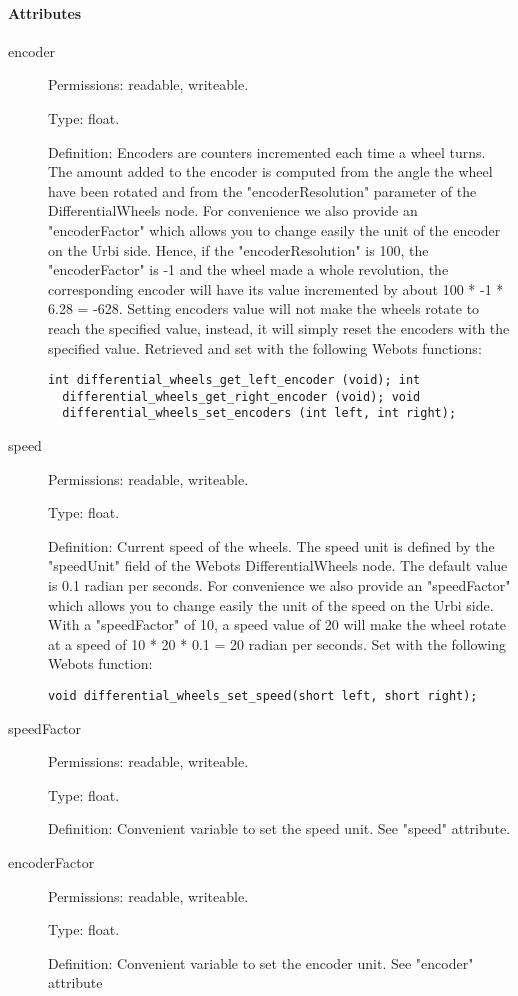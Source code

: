 \paragraph{Attributes}
\label{webots.uobjects.robotdevices.differentialwheels.attributes}%

\noindent
\begin{description}
\item[{encoder}] Permissions: readable, writeable.


  Type: float.


  Definition: Encoders are counters incremented each time a wheel
  turns. The amount added to the encoder is computed from the angle
  the wheel have been rotated and from the "encoderResolution"
  parameter of the DifferentialWheels node. For convenience we also
  provide an "encoderFactor" which allows you to change easily the
  unit of the encoder on the Urbi side.  Hence, if the
  "encoderResolution" is 100, the "encoderFactor" is -{}1 and the
  wheel made a whole revolution, the corresponding encoder will have
  its value incremented by about 100 * -{}1 * 6.28 = -{}628.  Setting
  encoders value will not make the wheels rotate to reach the
  specified value, instead, it will simply reset the encoders with the
  specified value.  Retrieved and set with the following Webots
  functions:


\begin{lstlisting}[firstnumber=1,]
  int differential_wheels_get_left_encoder (void); int
  differential_wheels_get_right_encoder (void); void
  differential_wheels_set_encoders (int left, int right);
\end{lstlisting}
\item[{speed}] Permissions: readable, writeable.


  Type: float.


  Definition: Current speed of the wheels. The speed unit is defined
  by the "speedUnit" field of the Webots DifferentialWheels node. The
  default value is 0.1 radian per seconds. For convenience we also
  provide an "speedFactor" which allows you to change easily the unit
  of the speed on the Urbi side.  With a "speedFactor" of 10, a speed
  value of 20 will make the wheel rotate at a speed of 10 * 20 * 0.1 =
  20 radian per seconds.  Set with the following Webots function:


\begin{lstlisting}[firstnumber=1,]
  void differential_wheels_set_speed(short left, short right);
\end{lstlisting}
\item[{speedFactor}] Permissions: readable, writeable.


  Type: float.


  Definition: Convenient variable to set the speed unit. See "speed"
  attribute.

\item[{encoderFactor}] Permissions: readable, writeable.


  Type: float.


  Definition: Convenient variable to set the encoder unit. See
  "encoder" attribute

\end{description}

